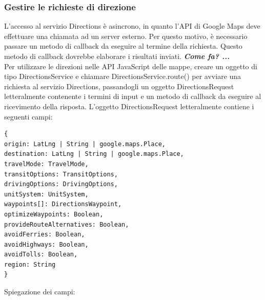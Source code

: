 \documentclass[]{scrartcl}
\begin{document}
\subsubsection{Gestire le richieste di direzione}
L'accesso al servizio Directions è asincrono, in quanto l'API di Google Maps deve effettuare una chiamata ad un server esterno. Per questo motivo, è necessario passare un metodo di callback da eseguire al termine della richiesta. Questo metodo di callback dovrebbe elaborare i risultati inviati.
\textit{\textbf{Come fa? ... }}\\
Per utilizzare le direzioni nelle API JavaScript delle mappe, creare un oggetto di tipo DirectionsService e chiamare DirectionsService.route() per avviare una richiesta al servizio Directions, passandogli un oggetto DirectionsRequest letteralmente contenente i termini di input e un metodo di callback da eseguire al ricevimento della risposta.
L'oggetto DirectionsRequest letteralmente contiene i seguenti campi:
\lstset{frameround=fttt}
\begin{lstlisting}[frame=trBL]
{
origin: LatLng | String | google.maps.Place,
destination: LatLng | String | google.maps.Place,
travelMode: TravelMode,
transitOptions: TransitOptions,
drivingOptions: DrivingOptions,
unitSystem: UnitSystem,
waypoints[]: DirectionsWaypoint,
optimizeWaypoints: Boolean,
provideRouteAlternatives: Boolean,
avoidFerries: Boolean,
avoidHighways: Boolean,
avoidTolls: Boolean,
region: String
}
\end{lstlisting}
Spiegazione dei campi:
\end{document}
